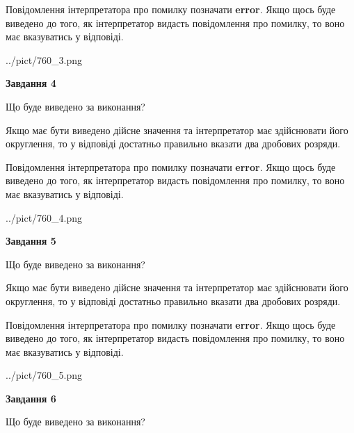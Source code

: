 \documentclass[12pt, ukrainian]{article}
\begin{document}
{\begin {Large}
Повідомлення інтерпретатора про помилку позначати \textbf{error}.
Якщо щось буде виведено до того, як інтерпретатор видасть повідомлення про помилку, 
то воно має вказуватись у відповіді. \par

\begin{center}
	{../pict/760_3.png}
\end{center}
\newpage

{\begin {center}\textbf{Завдання 4}\end {center}}\par
Що буде виведено за виконання? \par

Якщо має бути виведено дійсне значення та інтерпретатор має здійснювати його округлення, 
то у відповіді достатньо правильно вказати два дробових розряди.

Повідомлення інтерпретатора про помилку позначати \textbf{error}.
Якщо щось буде виведено до того, як інтерпретатор видасть повідомлення про помилку, 
то воно має вказуватись у відповіді. \par

\begin{center}
	{../pict/760_4.png}
\end{center}
\newpage

{\begin {center}\textbf{Завдання 5}\end {center}}\par
Що буде виведено за виконання? \par

Якщо має бути виведено дійсне значення та інтерпретатор має здійснювати його округлення, 
то у відповіді достатньо правильно вказати два дробових розряди.

Повідомлення інтерпретатора про помилку позначати \textbf{error}.
Якщо щось буде виведено до того, як інтерпретатор видасть повідомлення про помилку, 
то воно має вказуватись у відповіді. \par

\begin{center}
	{../pict/760_5.png}
\end{center}
\newpage

{\begin {center}\textbf{Завдання 6}\end {center}}\par
Що буде виведено за виконання? \par


\end{Large}}
\end{document}
